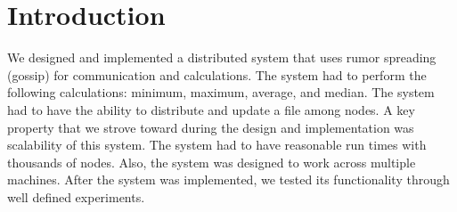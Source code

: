 \section{Introduction}
We designed and implemented a distributed system that uses rumor spreading (gossip) for communication and calculations. The system had to perform the following calculations: minimum, maximum, average, and median. The system had to have the ability to distribute and update a file among nodes. A key property that we strove toward during the design and implementation was scalability of this system. The system had to have reasonable run times with thousands of nodes. Also, the system was designed to work across multiple machines. After the system was implemented, we tested its functionality through well defined experiments. 

